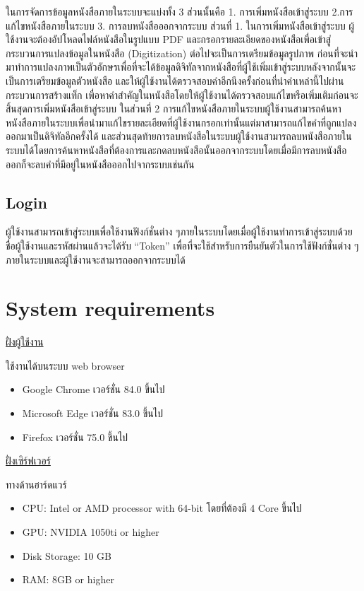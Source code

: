 ในการจัดการข้อมูลหนังสือภายในระบบจะแบ่งทั้ง 3 ส่วนนั้นคือ 1. การเพิ่มหนังสือเข้าสู่ระบบ 2.การแก้ไขหนังสือภายในระบบ  3. การลบหนังสือออกจากระบบ 
ส่วนที่ 1. ในการเพิ่มหนังสือเข้าสู่ระบบ ผู้ใช้งานจะต้องอัปโหลดไฟล์หนังสือในรูปแบบ PDF และกรอกรายละเอียดของหนังสือเพื่อเข้าสู่กระบวนการแปลงข้อมูลในหนังสือ (Digitization) ต่อไปจะเป็นการเตรียมข้อมูลรูปภาพ ก่อนที่จะนำมาทำการแปลงภาพเป็นตัวอักษรเพื่อที่จะได้ข้อมูลดิจิทัลจากหนังสือที่ผู้ใช้เพิ่มเข้าสู่ระบบหลังจากนั้นจะเป็นการเตรียมข้อมูลตัวหนังสือ และให้ผู้ใช้งานได้ตรวจสอบคำอีกนึงครั้งก่อนที่นำคำเหล่านี้ไปผ่านกระบวนการสร้างแท็ก เพื่อหาคำสำคัญในหนังสือโดยให้ผู้ใช้งานได้ตรวจสอบแก้ไขหรือเพิ่มเติมก่อนจะสิ้นสุดการเพิ่มหนังสือเข้าสู่ระบบ ในส่วนที่ 2 การแก้ไขหนังสือภายในระบบผู้ใช้งานสามารถค้นหาหนังสือภายในระบบเพื่อนำมาแก้ไขรายละเอียดที่ผู้ใช้งานกรอกเท่านั้นแต่มาสามารถแก้ไขคำที่ถูกแปลงออกมาเป็นดิจิทัลอีกครั้งได้ และส่วนสุดท้ายการลบหนังสือในระบบผู้ใช้งานสามารถลบหนังสือภายในระบบได้โดยการค้นหาหนังสือที่ต้องการและกดลบหนังสือนั้นออกจากระบบโดยเมื่อมีการลบหนังสือออกก็จะลบคำที่มีอยู่ในหนังสือออกไปจากระบบเช่นกัน

\subsection{Login}

ผู้ใช้งานสามารถเข้าสู่ระบบเพื่อใช้งานฟังก์ชั่นต่าง ๆภายในระบบโดยเมื่อผู้ใช้งานทำการเข้าสู่ระบบด้วยชื่อผู้ใช้งานและรหัสผ่านแล้วจะได้รับ “Token” เพื่อที่จะใช้สำหรับการยืนยันตัวในการใช้ฟังก์ชั่นต่าง ๆภายในระบบและผู้ใช้งานจะสามารถออกจากระบบได้

\section{System requirements}

\underline{ฝั่งผู้ใช้งาน}

ใช้งานได้บนระบบ web browser 

\begin{itemize}
    \item Google Chrome เวอร์ชั่น 84.0 ขึ้นไป 
    \item Microsoft Edge เวอร์ชั่น 83.0 ขึ้นไป
    \item Firefox เวอร์ชั่น 75.0 ขึ้นไป
\end{itemize}
 
\underline{ฝั่งเซิร์ฟเวอร์}
		
ทางด้านฮาร์ดแวร์

        \begin{itemize}
            \item CPU: Intel or AMD processor with 64-bit โดยที่ต้องมี 4 Core ขึ้นไป
            \item GPU: NVIDIA 1050ti or higher
            \item Disk Storage: 10 GB
            \item RAM: 8GB or higher
        \end{itemize}
        
